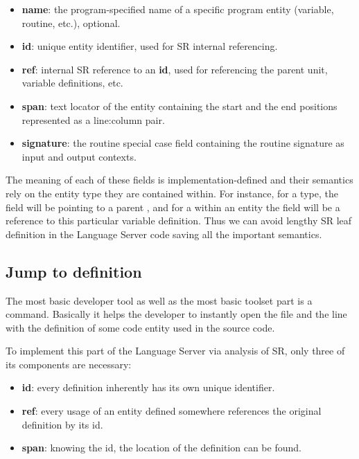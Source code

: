 \begin{itemize}
    \item \textbf{name}: the program-specified name of a specific program entity (variable, routine, etc.), optional.
    \item \textbf{id}:   unique entity identifier, used for SR internal referencing.
    \item \textbf{ref}:  internal SR reference to an \textbf{id}, used for referencing the parent unit, variable definitions, etc.
    \item \textbf{span}: text locator of the entity containing the start and the end positions represented as a line:column pair.
    \item \textbf{signature}: the routine special case field containing the routine signature as input and output contexts.
\end{itemize}

The meaning of each of these fields is implementation-defined and their semantics rely on the entity type they are contained within.
For instance, for a  type, the  field will be pointing to a parent ,
and for a  within an  entity the  field will be a reference to this particular variable definition.
Thus we can avoid lengthy SR leaf definition in the Language Server code saving all the important semantics.

\subsection{Jump to definition}

The most basic developer tool as well as the most basic toolset part is a  command.
Basically it helps the developer to instantly open the file and the line with the definition of some code entity used in the source code.

To implement this part of the Language Server via analysis of SR, only three of its components are necessary:

\begin{itemize}
    \item \textbf{id}:   every definition inherently has its own unique identifier.
    \item \textbf{ref}:  every usage of an entity defined somewhere references the original definition by its id.
    \item \textbf{span}: knowing the id, the location of the definition can be found.
\end{itemize}

